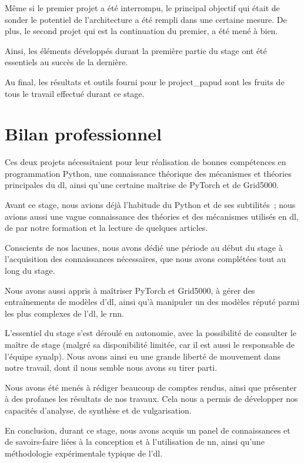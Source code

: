 Même si le premier projet a été interrompu, le principal objectif qui était de sonder le potentiel de l'architecture a été rempli dans une certaine mesure. De plus, le second projet qui est la continuation du premier, a été mené à bien.

Ainsi, les éléments développés durant la première partie du stage ont été essentiels au succès de la dernière.

Au final, les résultats et outils fourni pour le \gls{project_papud} sont les fruits de tous le travail effectué durant ce stage.

\section{Bilan professionnel}
Ces deux projets nécessitaient pour leur réalisation de bonnes compétences en programmation Python, une connaissance théorique des mécanismes et théories principales du \gls{dl}, ainsi qu'une certaine maîtrise de PyTorch et de Grid5000.

Avant ce stage, nous avions déjà l'habitude du Python et de ses subtilités~; nous avions aussi une vague connaissance des théories et des mécanismes utilisés en \gls{dl}, de par notre formation et la lecture de quelques articles.

Conscients de nos lacunes, nous avons dédié une période au début du stage à l'acquisition des connaissances nécessaires, que nous avons complétées tout au long du stage.

Nous avons aussi appris à maîtriser PyTorch et Grid5000, à gérer des entraînements de modèles d'\gls{dl}, ainsi qu'à  manipuler un des modèles réputé parmi les plus complexes de l'\gls{dl}, le \gls{rnn}.


L'essentiel du stage s'est déroulé en autonomie, avec la possibilité de consulter le maître de stage (malgré sa disponibilité limitée, car il est aussi le responsable de l'équipe \gls{synalp}). Nous avons ainsi eu une grande liberté de mouvement dans notre travail, dont il nous semble nous avons su tirer parti.

Nous avons été menés à rédiger beaucoup de comptes rendus, ainsi que présenter à des profanes les résultats de nos travaux. Cela nous a permis de développer nos capacités d'analyse, de synthèse et de vulgarisation.

En conclusion, durant ce stage, nous avons acquis un panel de connaissances et de savoirs-faire liées à la conception et à l'utilisation de \gls{nn}, ainsi qu'une méthodologie expérimentale typique de l'\gls{dl}.

